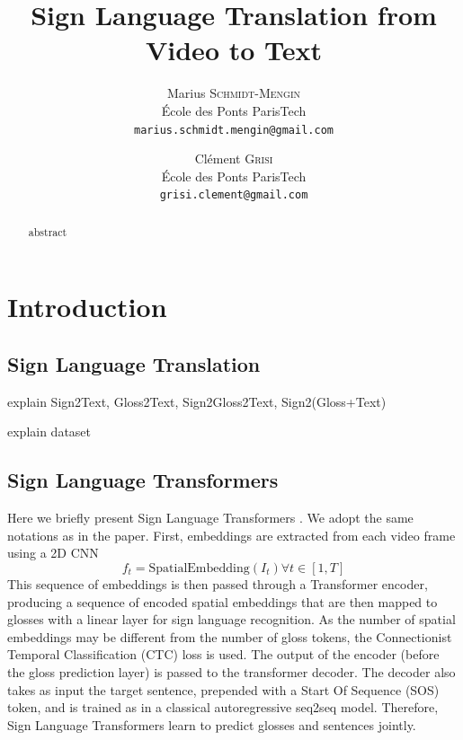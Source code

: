 \documentclass[final]{cvpr}
\begin{document}
\title{Sign Language Translation from Video to Text}

\author{Marius \textsc{Schmidt-Mengin}\\
	École des Ponts ParisTech\\
	{\tt\small marius.schmidt.mengin@gmail.com}
\and
Clément \textsc{Grisi}\\
École des Ponts ParisTech\\
{\tt\small grisi.clement@gmail.com}
}

\maketitle


\begin{abstract}
   abstract
   \vspace{5cm}
\end{abstract}

\section{Introduction}

\subsection{Sign Language Translation}

explain Sign2Text, Gloss2Text, Sign2Gloss2Text, Sign2(Gloss+Text)

explain dataset


\subsection{Sign Language Transformers}

Here we briefly present Sign Language Transformers \cite{neccam}. We adopt the same notations as in the paper. First, embeddings are extracted from each video frame using a 2D CNN
$$f_{t}= \text{SpatialEmbedding} \left(I_{t}\right) \forall t\in[1, T]$$
This sequence of embeddings is then passed through a Transformer encoder, producing a sequence of encoded spatial embeddings that are then mapped to glosses with a linear layer for sign language recognition. As the number of spatial embeddings may be different from the number of gloss tokens, the Connectionist Temporal Classification (CTC) loss is used. The output of the encoder (before the gloss prediction layer) is passed to the transformer decoder. The decoder also takes as input the target sentence, prepended with a Start Of Sequence (SOS) token, and is trained as in a classical autoregressive seq2seq model. Therefore, Sign Language Transformers learn to predict glosses and sentences jointly.
\end{document}
